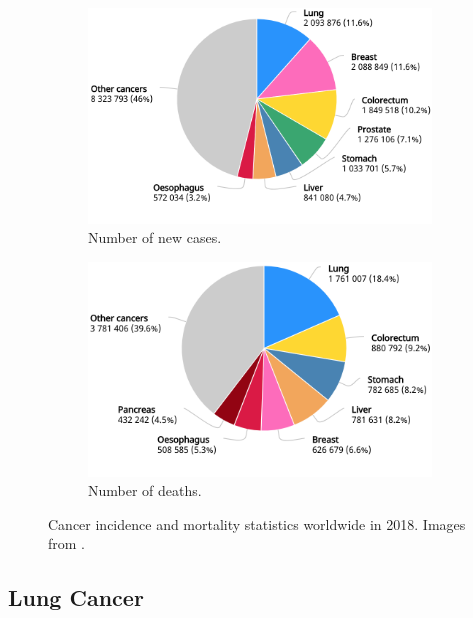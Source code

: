\begin{figure}[t]
    \centering
    \begin{subfigure}{0.49\textwidth}
        \centering
        \includegraphics[width=\textwidth]{Images/chapter_1/cancer_cases.png}
        \caption{Number of new cases.}
        \label{fig:GCO_1}
    \end{subfigure}
    \hfill
    \begin{subfigure}{0.49\textwidth}
        \centering
        \includegraphics[width=\textwidth]{Images/chapter_1/cancer_deaths.png}
        \caption{Number of deaths.}
        \label{fig:GCO_2}
    \end{subfigure}
    \caption{Cancer incidence and mortality statistics worldwide in 2018. Images from \cite{GCO}.}
    \label{fig:GCO}
\end{figure}

\subsection{Lung Cancer}

